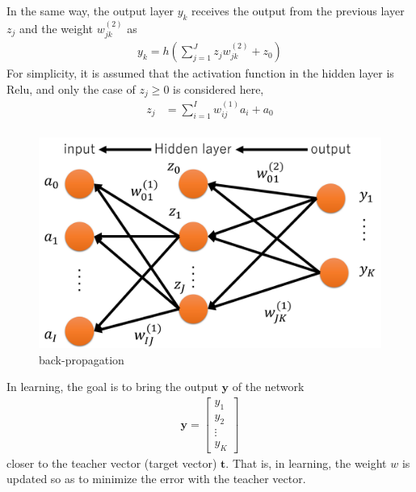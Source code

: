 \documentclass[a4paper,12pt]{article}
\begin{document}
In the same way, the output layer $y_k$ receives the output from the previous layer $z_j$ and the weight $w^{(2)}_{jk}$ as
\begin{align}
y_k=h(\sum^J_{j=1}{z_j w_{jk}^{(2)}}+z_0)
\end{align}
For simplicity, it is assumed that the activation function in the hidden layer is Relu, and only the case of $z_j \geq 0$ is considered here,
\begin{align}
z_j&=\sum_{i=1}^I{w_{ij}^{(1)}}a_i+a_0 \\
\end{align} \par
\begin{figure}[ht]
\begin{center}
\includegraphics[scale=0.45]{figure5.png}
\caption{back-propagation}
\end{center}
\end{figure}
In learning, the goal is to bring the output ${\bm y}$ of the network
\begin{align}
{\bm y}=\left[\begin{array}{ccc}
	y_1 \\
	y_2 \\
	\vdots \\
	y_K
	\end{array}\right]
\end{align}
closer to the teacher vector (target vector) ${\bm t}$. That is, in learning, the weight $w$ is updated so as to minimize the error with the teacher vector. \par
\end{document}

